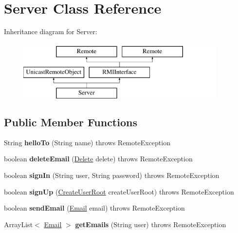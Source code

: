 \hypertarget{class_server}{}\section{Server Class Reference}
\label{class_server}
Inheritance diagram for Server\+:\begin{figure}[H]
\begin{center}
\leavevmode
\includegraphics[height=3.000000cm]{class_server}
\end{center}
\end{figure}
\subsection*{Public Member Functions}
\begin{DoxyCompactItemize}
\item 
\mbox{\label{class_server_a5bb8a4d74a82c7e2590de523648fa3ab}} 
String {\bfseries hello\+To} (String name)  throws Remote\+Exception 
\item 
\mbox{\label{class_server_ad679fc8c7704690482684e42cc15c740}} 
boolean {\bfseries delete\+Email} (\hyperlink{class_delete}{Delete} delete)  throws Remote\+Exception
\item 
\mbox{\label{class_server_a817e1af39aeac07664ce011c44013e55}} 
boolean {\bfseries sign\+In} (String user, String password)  throws Remote\+Exception 
\item 
\mbox{\label{class_server_a9e4fcd4cc8bfb0484735adfcf38be657}} 
boolean {\bfseries sign\+Up} (\hyperlink{class_create_user_root}{Create\+User\+Root} create\+User\+Root)  throws Remote\+Exception 
\item 
\mbox{\label{class_server_a4c26769f2867086519a196bc92502af6}} 
boolean {\bfseries send\+Email} (\hyperlink{class_email}{Email} email)  throws Remote\+Exception 
\item 
\mbox{\label{class_server_a348f49650335ef5341a4d960d6adac2e}} 
Array\+List$<$ \hyperlink{class_email}{Email} $>$ {\bfseries get\+Emails} (String user)  throws Remote\+Exception 
\end{DoxyCompactItemize}
